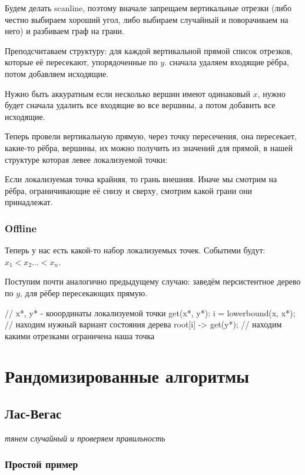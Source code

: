 Будем делать scanline, поэтому вначале запрещаем вертикальные 
отрезки (либо честно выбираем хороший угол, либо выбираем случайный 
и поворачиваем на него) и разбиваем граф на грани.

Преподсчитаваем структуру: для каждой вертикальной прямой список отрезков, которые
её пересекают, упорядоченные по $y$.  сначала удаляем входящие рёбра, потом добавляем
исходящие.


Нужно быть аккуратным если несколько вершин имеют одинаковый $x$, нужно будет
сначала удалить все входящие во все вершины, а потом добавить все исходящие.

Теперь провели вертикальную прямую, через точку пересечения, она пересекает,
какие-то рёбра, вершины, их можно получить из значений для прямой,
в нашей структуре которая левее локализуемой точки:

Если локализуемая точка крайняя, то грань внешняя. Иначе мы смотрим на рёбра, 
ограничивающие её снизу и сверху, смотрим какой грани они принадлежат.

\subsection{Offline}

Теперь у нас есть какой-то набор локализуемых точек.
Событими будут: $x_1 < x_2 \ldots < x_n$.

Поступим почти аналогично предыдущему случаю: заведём персистентное дерево по $y$,
для рёбер пересекающих прямую.

\begin{cppcode}
    // x*, y* - кооординаты локализуемой точки
    get(x*, y*):
        i = lowerbound(x, x*); // находим нужный вариант состояния дерева
        root[i] -> get(y*);      // находим какими отрезками ограничена наша точка
\end{cppcode}


\chapter{Рандомизированные алгоритмы}

\section{Лас-Вегас}

\textit{тянем случайный и проверяем правильность}

\subsection{Простой пример}

